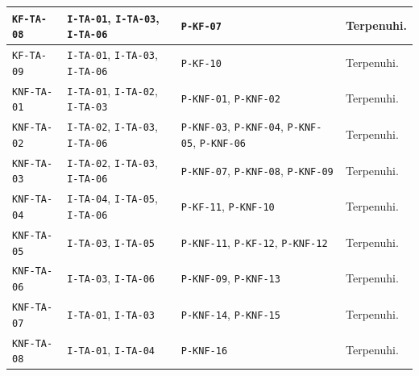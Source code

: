 \begin{longtable}{|p{}|p{}|p{}|p{}|}
	\texttt{KF-TA-08}  & \texttt{I-TA-01}, \texttt{I-TA-03}, \texttt{I-TA-06} & \texttt{P-KF-07}                                                           & Terpenuhi.      \\ \hline
	\texttt{KF-TA-09}  & \texttt{I-TA-01}, \texttt{I-TA-03}, \texttt{I-TA-06} & \texttt{P-KF-10}                                                           & Terpenuhi.      \\ \hline
	\texttt{KNF-TA-01} & \texttt{I-TA-01}, \texttt{I-TA-02}, \texttt{I-TA-03} & \texttt{P-KNF-01}, \texttt{P-KNF-02}                                       & Terpenuhi.      \\ \hline
	\texttt{KNF-TA-02} & \texttt{I-TA-02}, \texttt{I-TA-03}, \texttt{I-TA-06} & \texttt{P-KNF-03}, \texttt{P-KNF-04}, \texttt{P-KNF-05}, \texttt{P-KNF-06} & Terpenuhi.      \\ \hline
	\texttt{KNF-TA-03} & \texttt{I-TA-02}, \texttt{I-TA-03}, \texttt{I-TA-06} & \texttt{P-KNF-07}, \texttt{P-KNF-08}, \texttt{P-KNF-09}                    & Terpenuhi.      \\ \hline
	\texttt{KNF-TA-04} & \texttt{I-TA-04}, \texttt{I-TA-05}, \texttt{I-TA-06} & \texttt{P-KF-11}, \texttt{P-KNF-10}                                        & Terpenuhi.      \\ \hline
	\texttt{KNF-TA-05} & \texttt{I-TA-03}, \texttt{I-TA-05}                   & \texttt{P-KNF-11}, \texttt{P-KF-12}, \texttt{P-KNF-12}                     & Terpenuhi.      \\ \hline
	\texttt{KNF-TA-06} & \texttt{I-TA-03}, \texttt{I-TA-06}                   & \texttt{P-KNF-09}, \texttt{P-KNF-13}                                       & Terpenuhi.      \\ \hline
	\texttt{KNF-TA-07} & \texttt{I-TA-01}, \texttt{I-TA-03}                   & \texttt{P-KNF-14}, \texttt{P-KNF-15}                                       & Terpenuhi.      \\ \hline
	\texttt{KNF-TA-08} & \texttt{I-TA-01}, \texttt{I-TA-04}                   & \texttt{P-KNF-16}                                                          & Terpenuhi.      \\ \hline
\end{longtable}
\endgroup

